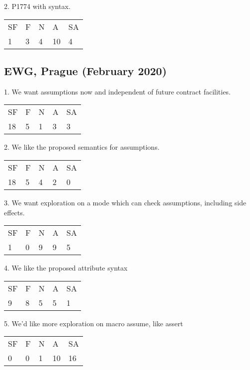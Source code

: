 2. P1774 with  syntax.

\hspace{6mm}
\begin{tabular}{lllll}
SF & F & N & A & SA \\
1 & 3 & 4 & 10 & 4
\end{tabular}

\subsection*{EWG, Prague (February 2020)}

1. We want assumptions now and independent of future contract facilities.

\hspace{6mm}
\begin{tabular}{lllll}
SF & F & N & A & SA \\
18 & 5 & 1 & 3 & 3
\end{tabular}

2. We like the proposed semantics for assumptions.

\hspace{6mm}
\begin{tabular}{lllll}
SF & F & N & A & SA \\
18 & 5 & 4 & 2 & 0
\end{tabular}

3. We want exploration on a mode which can check assumptions, including side effects.

\hspace{6mm}
\begin{tabular}{lllll}
SF & F & N & A & SA \\
1 & 0 & 9 & 9 & 5
\end{tabular}

4. We like the proposed attribute syntax 

\hspace{6mm}
\begin{tabular}{lllll}
SF & F & N & A & SA \\
9 & 8 & 5 & 5 & 1
\end{tabular}

5. We’d like more exploration on macro assume, like assert

\hspace{6mm}
\begin{tabular}{lllll}
SF & F & N & A & SA \\
0 & 0 & 1 & 10 & 16
\end{tabular}

